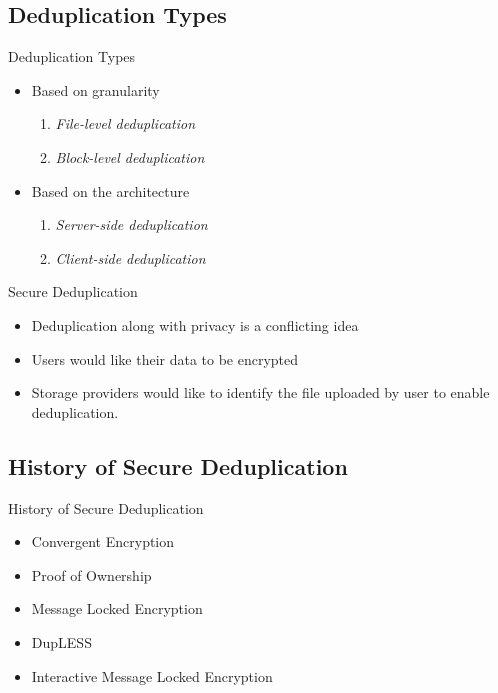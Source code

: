 \documentclass{beamer}
\begin{document}
\subsection{Deduplication Types}
\begin{frame}{Deduplication Types}
  \begin{itemize}
  \item {
    Based on granularity
    \pause %
    \begin{enumerate}
		\item \textit{File-level deduplication}
		\item \textit{Block-level deduplication}
	\end{enumerate}
	\pause
  }
  \item {   
	 Based on the architecture
	 \pause
	 \begin{enumerate}
	 	\item \textit{Server-side deduplication}
		
		\item \textit{Client-side deduplication}
	\end{enumerate}
  }
  \end{itemize}
\end{frame}

\begin{frame}{Secure Deduplication}
\begin{itemize}
	\item Deduplication along with privacy is a conflicting idea

	\item Users would like their data to be encrypted
	
	\item Storage providers would like to identify the file uploaded by user
		to enable deduplication.
\end{itemize}
\end{frame}


\subsection{History of Secure Deduplication}

\begin{frame}{History of Secure Deduplication}
	\begin{itemize}
		\item Convergent Encryption
		\item Proof of Ownership
		\item Message Locked Encryption
		\item DupLESS
		\item Interactive Message Locked Encryption
	\end{itemize}
\end{frame}
\end{document}
